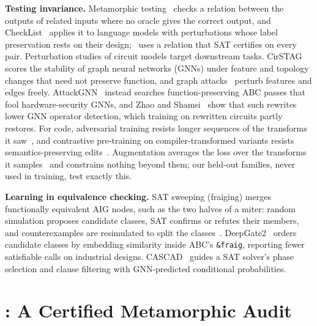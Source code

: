 \noindent\textbf{Testing invariance.} Metamorphic testing~\cite{DBLP:journals/corr/abs-2002-12543,DBLP:journals/tse/SeguraFSC16} checks a
relation between the outputs of related inputs where no oracle gives the correct output, and CheckList~\cite{DBLP:conf/acl/RibeiroWGS20}
applies it to language models with perturbations whose label preservation rests on their design; \audit\ uses a
relation that SAT certifies on every pair. Perturbation studies of circuit models target downstream tasks.
CirSTAG~\cite{DBLP:conf/dac/ChengYDAZF25} scores the stability of graph neural networks (GNNs) under feature and topology changes that need not preserve function, and
graph attacks~\cite{DBLP:conf/kdd/ZugnerAG18} perturb features and edges freely. AttackGNN~\cite{attackgnn} instead searches
function-preserving ABC passes that fool hardware-security GNNs, and Zhao and Shamsi~\cite{DBLP:conf/glvlsi/ZhaoS22,rewrite_adv}
show that such rewrites lower GNN operator detection, which training on rewritten circuits partly restores. For
code, adversarial training resists longer sequences of the transforms it saw~\cite{DBLP:conf/wcre/HenkelRWAJR22}, and contrastive
pre-training on compiler-transformed variants resists semantics-preserving edits~\cite{DBLP:conf/emnlp/0001JZA0S21}. Augmentation
averages the loss over the transforms it samples~\cite{DBLP:conf/nips/ChenDL20} and constrains nothing beyond them; our
held-out families, never used in training, test exactly this.

\noindent\textbf{Learning in equivalence checking.} SAT sweeping (fraiging) merges functionally equivalent AIG
nodes, such as the two halves of a miter: random simulation proposes candidate classes, SAT confirms or refutes their
members, and counterexamples are resimulated to split the classes~\cite{DBLP:journals/tcad/KuehlmannPKG02,fraig,DBLP:conf/iccad/MishchenkoCBE06}. DeepGate2~\cite{DBLP:conf/iccad/ShiPKLLHZYCX23} orders candidate
classes by embedding similarity inside ABC's \texttt{\&fraig}, reporting fewer satisfiable calls on industrial
designs. CASCAD~\cite{DBLP:journals/corr/abs-2508-04235} guides a SAT solver's phase selection and clause filtering with GNN-predicted
conditional probabilities.

\section{\audit: A Certified Metamorphic Audit}\label{sec:audit}

